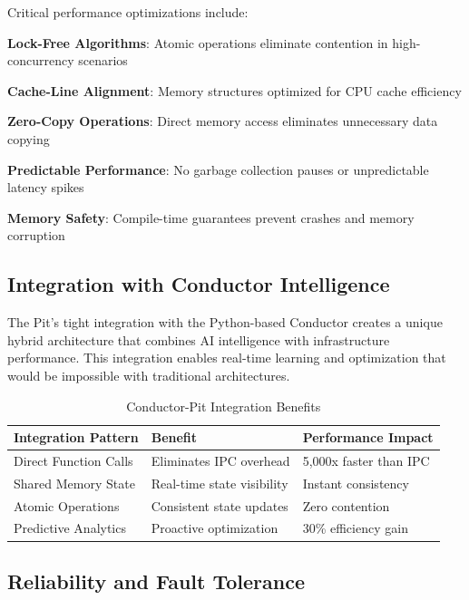 Critical performance optimizations include:

\begin{expandedlist}
    \item \textbf{Lock-Free Algorithms}: Atomic operations eliminate contention in high-concurrency scenarios
    \item \textbf{Cache-Line Alignment}: Memory structures optimized for CPU cache efficiency
    \item \textbf{Zero-Copy Operations}: Direct memory access eliminates unnecessary data copying
    \item \textbf{Predictable Performance}: No garbage collection pauses or unpredictable latency spikes
    \item \textbf{Memory Safety}: Compile-time guarantees prevent crashes and memory corruption
\end{expandedlist}

\subsection*{Integration with Conductor Intelligence}

The Pit's tight integration with the Python-based Conductor creates a unique hybrid architecture that combines AI intelligence with infrastructure performance. This integration enables real-time learning and optimization that would be impossible with traditional architectures.

\begin{table}[ht]
\centering
\begin{tabular}{@{}lll@{}}
\toprule
\textbf{Integration Pattern} & \textbf{Benefit} & \textbf{Performance Impact} \\
\midrule
Direct Function Calls & Eliminates IPC overhead & 5,000x faster than IPC \\
Shared Memory State & Real-time state visibility & Instant consistency \\
Atomic Operations & Consistent state updates & Zero contention \\
Predictive Analytics & Proactive optimization & 30\% efficiency gain \\
\bottomrule
\end{tabular}
\caption{Conductor-Pit Integration Benefits}
\end{table}

\subsection*{Reliability and Fault Tolerance}

